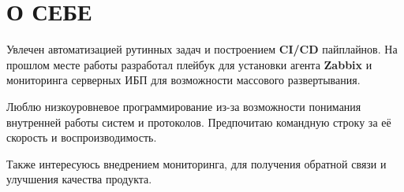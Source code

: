 \section{О СЕБЕ}

Увлечен автоматизацией рутинных задач и построением \textbf{CI/CD}
пайплайнов. На прошлом месте работы разработал плейбук для установки
агента \textbf{Zabbix} и мониторинга серверных ИБП для возможности
массового развертывания.

Люблю низкоуровневое программирование из-за возможности понимания
внутренней работы систем и протоколов. Предпочитаю командную строку за
её скорость и воспроизводимость.

Также интересуюсь внедрением мониторинга, для получения обратной связи
и улучшения качества продукта.

